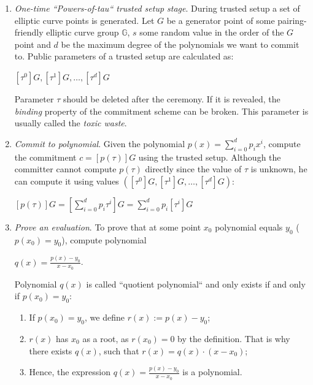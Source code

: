 \documentclass[../lecture-notes.tex]{subfiles}
\begin{document}
\begin{enumerate}
    \item \textit{One-time ``Powers-of-tau`` trusted setup stage}. During trusted setup a set of elliptic curve points is generated. 
    Let $G$ be a generator point of some pairing-friendly
    elliptic curve group $\mathbb{G}$, $s$ some random value in the order of the $G$ point and $d$ be the maximum degree 
    of the polynomials we want to commit to.
    Public parameters of a trusted setup are calculated as:

    \begin{center}
        $[\tau^0]G, [\tau^1]G, \ldots, [\tau^d]G$
    \end{center}

    Parameter $\tau$ should be deleted after the ceremony. If it is revealed, the \textit{binding} property of the commitment scheme can be broken. 
    This parameter is usually called the \textit{toxic waste}.
    
    \item \textit{Commit to polynomial}. Given the polynomial $p(x) = \sum_{i = 0}^{d} p_i x^i$, compute the commitment $c = [p(\tau)]G $ 
    using the trusted setup. Although the committer cannot compute $p(\tau)$ directly since the value of $\tau$ is unknown, he can
    compute it using values $([\tau^0]G, [\tau^1]G, \ldots, [\tau^d]G)$:
    
    \begin{center}
       $ [p(\tau)]G = [\sum_{i=0}^{d} p_i \tau^i]G = \sum_{i=0}^{d}p_i[\tau^i]G$
    \end{center}
    
    \item \textit{Prove an evaluation}. To prove that at some point $x_0$ polynomial equals $y_0$ ($p(x_0) = y_0$), compute polynomial
    
    \begin{center}
        $q(x) = \frac{p(x) - y_0}{x - x_0}$.
    \end{center}

    Polynomial $q(x)$ is called ``quotient polynomial`` and only exists if and only if $p(x_0) = y_0$:
    \begin{enumerate}
        \item If $p(x_0) = y_0$, we define $r(x) := p(x) - y_0$;
        \item $r(x)$ has $x_0$ as a root, as $r(x_0) = 0$ by the definition. 
            That is why there exists $q(x)$, such that $r(x) = q(x)\cdot (x-x_0)$;
        \item Hence, the expression $q(x) = \frac{p(x) - y_0}{x-x_0}$ is a polynomial.
    \end{enumerate}
    

\end{enumerate}
\end{document}
